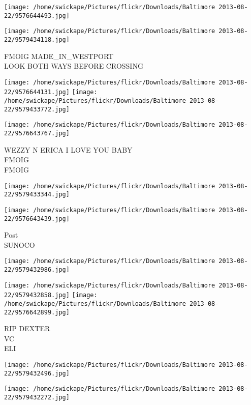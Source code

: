 \documentclass[10pt,letterpaper]{article}
\begin{document}
\texttt{[image: /home/swickape/Pictures/flickr/Downloads/Baltimore 2013-08-22/9576644493.jpg]}

\vspace{0.25in}
\texttt{[image: /home/swickape/Pictures/flickr/Downloads/Baltimore 2013-08-22/9579434118.jpg]}

FMOIG MADE\_IN\_WESTPORT\\
LOOK BOTH WAYS BEFORE CROSSING\\
\pagebreak

\texttt{[image: /home/swickape/Pictures/flickr/Downloads/Baltimore 2013-08-22/9576644131.jpg]}
\texttt{[image: /home/swickape/Pictures/flickr/Downloads/Baltimore 2013-08-22/9579433772.jpg]}

\vspace{0.25in}
\texttt{[image: /home/swickape/Pictures/flickr/Downloads/Baltimore 2013-08-22/9576643767.jpg]}

WEZZY N ERICA I LOVE YOU BABY\\
FMOIG\\
FMOIG\\
\pagebreak

\texttt{[image: /home/swickape/Pictures/flickr/Downloads/Baltimore 2013-08-22/9579433344.jpg]}

\vspace{0.25in}
\texttt{[image: /home/swickape/Pictures/flickr/Downloads/Baltimore 2013-08-22/9576643439.jpg]}

Post\\
SUNOCO\\
\pagebreak

\texttt{[image: /home/swickape/Pictures/flickr/Downloads/Baltimore 2013-08-22/9579432986.jpg]}

\vspace{0.25in}
\texttt{[image: /home/swickape/Pictures/flickr/Downloads/Baltimore 2013-08-22/9579432858.jpg]}
\texttt{[image: /home/swickape/Pictures/flickr/Downloads/Baltimore 2013-08-22/9576642899.jpg]}

RIP DEXTER\\
VC\\
ELI\\
\pagebreak

\texttt{[image: /home/swickape/Pictures/flickr/Downloads/Baltimore 2013-08-22/9579432496.jpg]}

\vspace{0.25in}
\texttt{[image: /home/swickape/Pictures/flickr/Downloads/Baltimore 2013-08-22/9579432272.jpg]}
\end{document}
